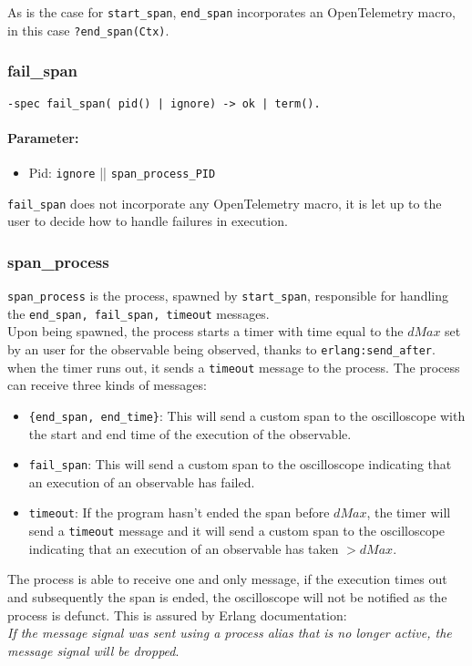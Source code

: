     As is the case for \texttt{start\_span}, \texttt{end\_span} incorporates an OpenTelemetry macro, in this case \texttt{?end\_span(Ctx)}. \\

        \subsubsection{fail\_span}
        \begin{verbatim}        
-spec fail_span( pid() | ignore) -> ok | term().
        \end{verbatim}
        \paragraph{Parameter:}
             \begin{itemize}
                \item Pid: \texttt{ignore} || \texttt{span\_process\_PID}
            \end{itemize}
            \texttt{fail\_span} does not incorporate any OpenTelemetry macro, it is let up to the user to decide how to handle failures in execution. \\
        

        \subsubsection{span\_process}
            \texttt{span\_process} is the process, spawned by \texttt{start\_span}, responsible for handling the \texttt{end\_span, fail\_span, timeout} messages. \\
            Upon being spawned, the process starts a timer with time equal to the $dMax$ set by an user for the observable being observed, thanks to \texttt{erlang:send\_after}. when the timer runs out, it sends a \texttt{timeout} message to the process.
        The process can receive three kinds of messages:
        \begin{itemize}
            \item \texttt{\{end\_span, end\_time\}}: This will send a custom span to the oscilloscope with the start and end time of the execution of the observable.
            \item \texttt{fail\_span}: This will send a custom span to the oscilloscope indicating that an execution of an observable has failed.
            \item \texttt{timeout}: If the program hasn't ended the span before $dMax$, the timer will send a \texttt{timeout} message and it will send a custom span to the oscilloscope indicating that an execution of an observable has taken $> dMax$.
        \end{itemize}
        The process is able to receive one and only message, if the execution times out and subsequently the span is ended, the oscilloscope will not be notified as the process is defunct. This is assured by Erlang documentation: \\
        \textit{If the message signal was sent using a process alias that is no longer active, the message signal will be dropped}. %

